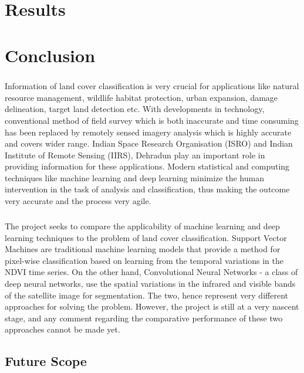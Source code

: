 \documentclass[12pt, a4paper]{report}
\begin{document}
\chapter{Results}


\chapter{Conclusion}

\paragraph{}
Information of land cover classification is very crucial for applications like natural resource management, wildlife habitat protection, urban expansion, damage delineation, target land detection etc. With developments in technology, conventional method of field survey which is both inaccurate and time consuming has been replaced by remotely sensed imagery analysis which is highly accurate and covers wider range. Indian Space Research Organisation (ISRO) and Indian Institute of Remote Sensing (IIRS), Dehradun play an important role in providing information for these applications. Modern statistical and computing techniques like machine learning and deep learning minimize the human intervention in the task of analysis and classification, thus making the outcome very accurate and the process very agile.
\paragraph{}
The project seeks to compare the applicability of machine learning and deep learning techniques to the problem of land cover classification. Support Vector Machines are traditional machine learning models that provide a method for pixel-wise classification based on learning from the temporal variations in the NDVI time series. On the other hand, Convolutional Neural Networks - a class of deep neural networks, use the spatial variations in the infrared and visible bands of the satellite image for segmentation. The two, hence represent very different approaches for solving the problem. However, the project is still at a very nascent stage, and any comment regarding the comparative performance of these two approaches cannot be made yet.

\section{Future Scope}
\end{document}
